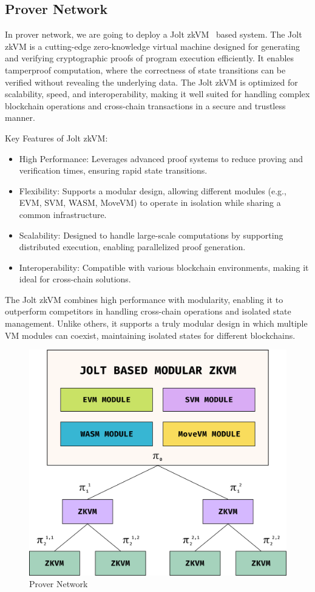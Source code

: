 \subsection{Prover Network}
In prover network, we are going to deploy a Jolt zkVM~\cite{jolt} based system. The Jolt zkVM is a cutting-edge zero-knowledge virtual machine designed for generating and verifying cryptographic proofs of program execution efficiently. It enables tamperproof computation, where the correctness of state transitions can be verified without revealing the underlying data. The Jolt zkVM is optimized for scalability, speed, and interoperability, making it well suited for handling complex blockchain operations and cross-chain transactions in a secure and trustless manner.  

Key Features of Jolt zkVM: 
\begin{itemize}
    \item \textsf{High Performance}: Leverages advanced proof systems to reduce proving and verification times, ensuring rapid state transitions.  
    \item \textsf{Flexibility}: Supports a modular design, allowing different modules (e.g., EVM, SVM, WASM, MoveVM) to operate in isolation while sharing a common infrastructure.  
    \item \textsf{Scalability}: Designed to handle large-scale computations by supporting distributed execution, enabling parallelized proof generation.  
    \item \textsf{Interoperability}: Compatible with various blockchain environments, making it ideal for cross-chain solutions.  
\end{itemize}


The Jolt zkVM combines high performance with modularity, enabling it to outperform competitors in handling cross-chain operations and isolated state management. Unlike others, it supports a truly modular design in which multiple VM modules can coexist, maintaining isolated states for different blockchains.  

\begin{figure}[h]
    \centering
    \includegraphics[width=0.7\linewidth]{figure/prover.png}
    \caption{Prover Network}
    \label{fig:prover}
\end{figure}

